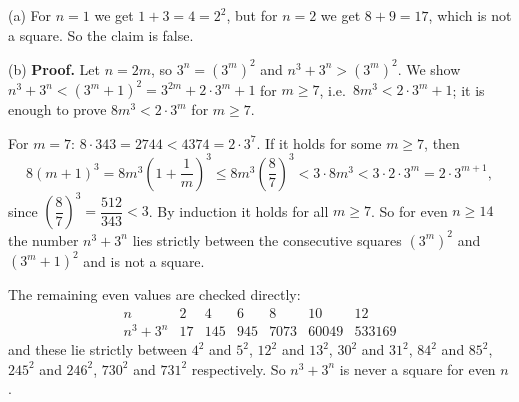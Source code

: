 (a) For $n=1$ we get $1+3=4=2^2$, but for $n=2$ we get $8+9=17$, which is not a square. So the claim is false.

(b) \textbf{Proof.} Let $n=2m$, so $3^n=\left(3^m\right)^2$ and $n^3+3^n>\left(3^m\right)^2$. We show $n^3+3^n<\left(3^m+1\right)^2=3^{2m}+2\cdot3^m+1$ for $m\ge7$, i.e.\ $8m^3<2\cdot3^m+1$; it is enough to prove $8m^3<2\cdot3^m$ for $m\ge7$.

For $m=7$: $8\cdot343=2744<4374=2\cdot3^7$. If it holds for some $m\ge7$, then
\[
8(m+1)^3=8m^3\left(1+\dfrac{1}{m}\right)^3\le8m^3\left(\dfrac{8}{7}\right)^3<3\cdot8m^3<3\cdot2\cdot3^m=2\cdot3^{m+1},
\]
since $\left(\dfrac{8}{7}\right)^3=\dfrac{512}{343}<3$. By induction it holds for all $m\ge7$. So for even $n\ge14$ the number $n^3+3^n$ lies strictly between the consecutive squares $\left(3^m\right)^2$ and $\left(3^m+1\right)^2$ and is not a square.

The remaining even values are checked directly:
\[
\begin{array}{c|cccccc}
n&2&4&6&8&10&12\\ \hline
n^3+3^n&17&145&945&7073&60049&533169
\end{array}
\]
and these lie strictly between $4^2$ and $5^2$, $12^2$ and $13^2$, $30^2$ and $31^2$, $84^2$ and $85^2$, $245^2$ and $246^2$, $730^2$ and $731^2$ respectively. So $n^3+3^n$ is never a square for even $n$.
